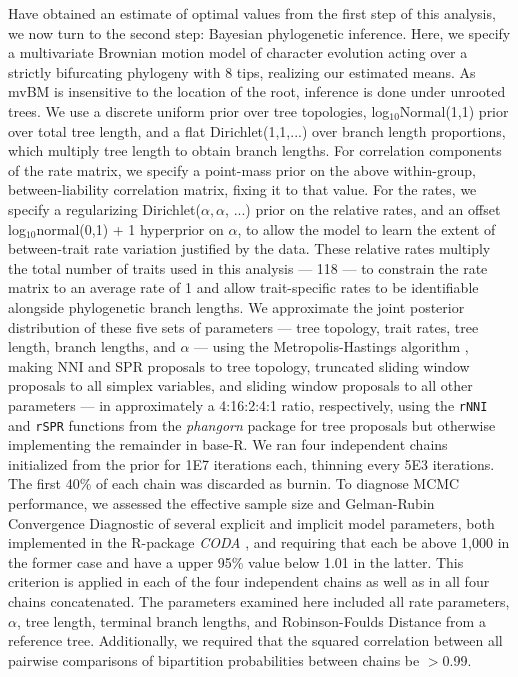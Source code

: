 Have obtained an estimate of optimal values from the first step of this analysis, we now turn to the second step: Bayesian phylogenetic inference. Here, we specify a multivariate Brownian motion model of character evolution acting over a strictly bifurcating phylogeny with 8 tips, realizing our estimated means. As mvBM is insensitive to the location of the root, inference is done under unrooted trees. We use a discrete uniform prior over tree topologies, log$_{10}$Normal(1,1) prior over total tree length, and a flat Dirichlet(1,1,...) over branch length proportions, which multiply tree length to obtain branch lengths. For correlation components of the rate matrix, we specify a point-mass prior on the above within-group, between-liability correlation matrix, fixing it to that value. For the rates, we specify a regularizing Dirichlet($\alpha, \alpha$, ...) prior on the relative rates, and an offset log$_{10}$normal(0,1) + 1 hyperprior on $\alpha$, to allow the model to learn the extent of between-trait rate variation justified by the data. These relative rates multiply the total number of traits used in this analysis --- 118 --- to constrain the rate matrix to an average rate of 1 and allow trait-specific rates to be identifiable alongside phylogenetic branch lengths. We approximate the joint posterior distribution of these five sets of parameters --- tree topology, trait rates, tree length, branch lengths, and $\alpha$ --- using the Metropolis-Hastings algorithm \citep{hastingsMonteCarloSampling1970}, making NNI and SPR proposals to tree topology, truncated sliding window proposals to all simplex variables, and sliding window proposals to all other parameters --- in approximately a 4:16:2:4:1 ratio, respectively, using the \texttt{rNNI} and \texttt{rSPR} functions from the \textit{phangorn} \citep{schliepPhangornPhylogeneticAnalysis2011} package for tree proposals but otherwise implementing the remainder in base-R. We ran four independent chains initialized from the prior for 1E7 iterations each, thinning every 5E3 iterations. The first 40\% of each chain was discarded as burnin. To diagnose MCMC performance, we assessed the effective sample size and Gelman-Rubin Convergence Diagnostic \citep{gelmanInferenceIterativeSimulation1992} of several explicit and implicit model parameters, both implemented in the R-package \textit{CODA} \citep{plummerCODAConvergenceDiagnosis2006}, and requiring that each be above 1,000 in the former case and have a upper 95\% value below 1.01 in the latter. This criterion is applied in each of the four independent chains as well as in all four chains concatenated. The parameters examined here included all rate parameters, $\alpha$, tree length, terminal branch lengths, and Robinson-Foulds Distance \citep{robinsonComparisonPhylogeneticTrees1981} from a reference tree. Additionally, we required that the squared correlation between all pairwise comparisons of bipartition probabilities between chains be $>$0.99.

